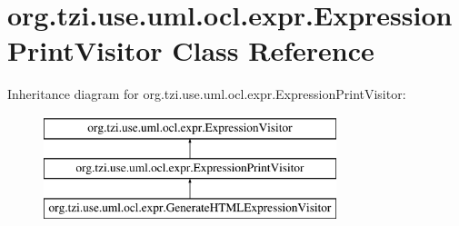\hypertarget{classorg_1_1tzi_1_1use_1_1uml_1_1ocl_1_1expr_1_1_expression_print_visitor}{\section{org.\-tzi.\-use.\-uml.\-ocl.\-expr.\-Expression\-Print\-Visitor Class Reference}
\label{classorg_1_1tzi_1_1use_1_1uml_1_1ocl_1_1expr_1_1_expression_print_visitor}
}
Inheritance diagram for org.\-tzi.\-use.\-uml.\-ocl.\-expr.\-Expression\-Print\-Visitor\-:\begin{figure}[H]
\begin{center}
\leavevmode
\includegraphics[height=3.000000cm]{classorg_1_1tzi_1_1use_1_1uml_1_1ocl_1_1expr_1_1_expression_print_visitor}
\end{center}
\end{figure}
